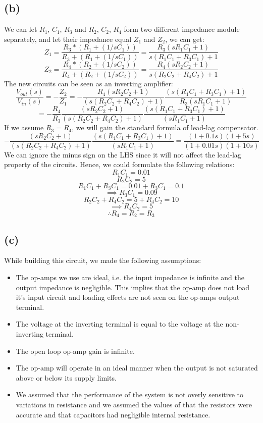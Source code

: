 \documentclass[letterpaper]{article}
\begin{document}
\subsection*{(b)}
We can let $R_1$, $C_1$, $R_3$ and $R_2$, $C_2$, $R_4$ form two different impedance module separately, and let their impedance equal $Z_1$ and $Z_2$, we can get:
$$Z_1 = \frac{R_3 * (R_1 + (1/sC_1))}{R_3 + (R_1 + (1/sC_1))} = \frac{R_3(sR_1C_1 +1)}{s(R_1C_1 + R_3C_1) + 1}$$
$$Z_2 = \frac{R_4 * (R_2 + (1/sC_2))}{R_4 + (R_2 + (1/sC_2))} = \frac{R_4(sR_2C_2 +1)}{s(R_2C_2 + R_4C_2) + 1}$$
The new circuits can be seen as an inverting amplifier:
$$\frac{V_{out}(s)}{V_{in}(s)} = - \frac{Z_2}{Z_1} = -  \frac{R_4(sR_2C_2 +1)}{(s(R_2C_2 + R_4C_2) + 1)}\frac{(s(R_1C_1 + R_3C_1) + 1)}{R_3(sR_1C_1 +1)} $$
$$=  -  \frac{R_4}{R_3}\frac{(sR_2C_2 +1)}{(s(R_2C_2 + R_4C_2) + 1)}\frac{(s(R_1C_1 + R_3C_1) + 1)}{(sR_1C_1 +1)} $$
If we assume $R_3 = R_4$, we will gain the standard formula of lead-lag compensator.
$$ - \frac{(sR_2C_2 +1)}{(s(R_2C_2 + R_4C_2) + 1)}\frac{(s(R_1C_1 + R_3C_1) + 1)}{(sR_1C_1 +1)}  = \frac{(1+0.1s)(1 + 5s)}{(1+0.01s)(1 + 10s)}$$
We can ignore the minus sign on the LHS since it will not affect the lead-lag property of the circuits. Hence, we could formulate the following relations:
$$R_1C_1 = 0.01$$
$$R_2C_2 = 5$$
$$R_1C_1 + R_3C_1 = 0.01 + R_3C_1 = 0.1$$
$$\implies R_3C_1 = 0.09$$
$$R_2C_2 + R_4C_2 = 5 + R_4C_2 = 10$$
$$\implies R_4C_2 = 5$$
$$\therefore R_4 = R_2 = R_3$$
\subsection*{(c)}
While building this circuit, we made the following assumptions:
\begin{itemize}
\item The op-amps we use are ideal, i.e. the input impedance is infinite and the output impedance is negligible. This implies that the op-amp does not load it's input circuit and loading effects are not seen on the op-amps output terminal.

\item The voltage at the inverting terminal is equal to the voltage at the non-inverting terminal.

\item The open loop op-amp gain is infinite.

\item The op-amp will operate in an ideal manner when the output is not saturated above or below its supply limits.

\item We assumed that the performance of the system is not overly sensitive to variations in resistance and we assumed the values of that the resistors were accurate and that capacitors had negligible internal resistance.
\end{itemize}
\end{document}
